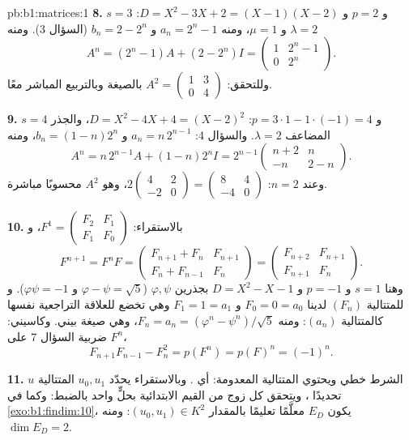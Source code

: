 \begin{solution}{pb:b1:matrices:1}
\textbf{8.} $s = 3$ و $p = 2$ و $D = X^2 - 3X + 2 = (X - 1)(X -
2)$: $\lambda = 2$ و $\mu = 1$، ومنه $a_n = 2^n - 1$ و $b_n = 2 -
2^n$ (السؤال 3). ومنه
\[
A^n = (2^n - 1)A + (2 - 2^n)I
= \begin{pmatrix} 1 & 2^n - 1\\ 0 & 2^n \end{pmatrix}.
\]
وللتحقق: $A^2 = \begin{pmatrix} 1 & 3\\ 0 & 4\end{pmatrix}$ بالصيغة
وبالتربيع المباشر معًا.

\textbf{9.} $s = 4$ و $p = 3\cdot1 - 1\cdot(-1) = 4$: $D = X^2 -
4X + 4 = (X - 2)^2$، والجذر المضاعف $\lambda = 2$. والسؤال 4: $a_n
= n\,2^{n-1}$ و $b_n = (1 - n)2^n$، ومنه
\[
A^n = n\,2^{n-1}A + (1 - n)2^n I
= 2^{n-1}\begin{pmatrix} n + 2 & n\\ -n & 2 - n
\end{pmatrix}.
\]
وعند $n = 2$: $2\begin{pmatrix} 4 & 2\\ -2 & 0\end{pmatrix} =
\begin{pmatrix} 8 & 4\\ -4 & 0 \end{pmatrix}$، وهو $A^2$
محسوبًا مباشرة.

\textbf{10.} بالاستقراء: $F^1 = \begin{pmatrix} F_2 & F_1\\ F_1 &
F_0\end{pmatrix}$، و
\[
F^{n+1} = F^n F =
\begin{pmatrix} F_{n+1} + F_n & F_{n+1}\\
F_n + F_{n-1} & F_n \end{pmatrix}
= \begin{pmatrix} F_{n+2} & F_{n+1}\\ F_{n+1} & F_n
\end{pmatrix}.
\]
وهنا $s = 1$ و $p = -1$ و $D = X^2 - X - 1$ بجذرين $\varphi,
\psi$ ($\varphi - \psi = \sqrt5$ و $\varphi\psi = -1$). و
للمتتالية $(F_n)$ لدينا $F_0 = 0 = a_0$ و $F_1 = 1 = a_1$ وهي تخضع
للعلاقة التراجعية نفسها كالمتتالية $(a_n)$: ومنه $F_n = a_n = (\varphi^n -
\psi^n)/\sqrt5$، وهي صيغة بيني. وكاسيني:  ضربية
السؤال 7 على $F^n$،
\[
F_{n+1}F_{n-1} - F_n^2 = p(F^n) = p(F)^n = (-1)^n .
\]

\textbf{11.} الشرط خطي ويحتوي المتتالية
المعدومة: أي . وبالاستقراء يحدّد $u_0, u_1$ المتتالية $u$
تحديدًا ، ويتحقق كل زوج من القيم الابتدائية بحلٍّ
واحد بالضبط: وكما في \cref{exo:b1:findim:10}، يكون $E_D$
معلَّمًا تعليمًا   بالمقدار $(u_0, u_1) \in K^2$:
ومنه $\dim E_D = 2$.


\end{solution}
